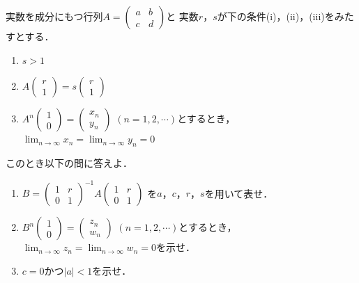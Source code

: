 \documentclass[../../main.tex]{subfiles}
\begin{document}
実数を成分にもつ行列$A=
\begin{pmatrix} a & b \\ c & d
\end{pmatrix}$と
実数$r$，$s$が下の条件(i)，(ii)，(iii)をみたすとする．
\begin{enumerate}
  \item[(i)] $s>1$
  \item[(ii)] $A
    \begin{pmatrix} r \\ 1
    \end{pmatrix}=s
    \begin{pmatrix} r \\ 1
    \end{pmatrix}$
  \item[(iii)] $A^n
    \begin{pmatrix} 1 \\ 0
    \end{pmatrix}=
    \begin{pmatrix} x_n \\ y_n
    \end{pmatrix}$
    $(n=1,2,\cdots)$とするとき，$\displaystyle\lim_{n\to\infty}x_n=\lim_{n\to\infty}y_n=0$
\end{enumerate}
このとき以下の問に答えよ．
\begin{enumerate}
  \item $B={
      \begin{pmatrix} 1 & r \\ 0 & 1
    \end{pmatrix}}^{-1}A
    \begin{pmatrix} 1 & r \\ 0 & 1
    \end{pmatrix}$
    を$a$，$c$，$r$，$s$を用いて表せ．
  \item $B^n
    \begin{pmatrix} 1 \\ 0
    \end{pmatrix}=
    \begin{pmatrix} z_n \\ w_n
    \end{pmatrix}$
    $(n=1,2,\cdots)$とするとき，$\displaystyle\lim_{n\to\infty}z_n=\lim_{n\to\infty}w_n=0$を示せ．
  \item $c=0$かつ$|a|<1$を示せ．
\end{enumerate}
\end{document}
